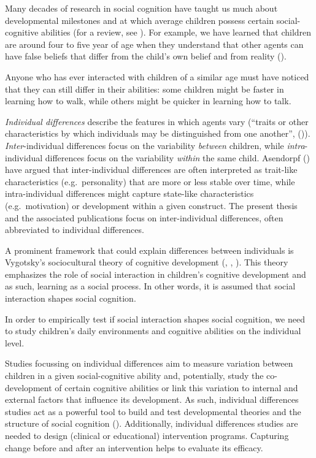 \documentclass[
]{scrbook}
\begin{document}
Many decades of research in social cognition have taught us much about developmental milestones and at which average children possess certain social-cognitive abilities (for a review, see ). For example, we have learned that children are around four to five year of age when they understand that other agents can have false beliefs that differ from the child's own belief and from reality ().

Anyone who has ever interacted with children of a similar age must have noticed that they can still differ in their abilities: some children might be faster in learning how to walk, while others might be quicker in learning how to talk.

\emph{Individual differences} describe the features in which agents vary (``traits or other characteristics by which individuals may be distinguished from one another'', ()). \emph{Inter}-individual differences focus on the variability \emph{between} children, while \emph{intra}-individual differences focus on the variability \emph{within} the same child. Asendorpf () have argued that inter-individual differences are often interpreted as trait-like characteristics (e.g.~personality) that are more or less stable over time, while intra-individual differences might capture state-like characteristics (e.g.~motivation) or development within a given construct. The present thesis and the associated publications focus on inter-individual differences, often abbreviated to individual differences.

A prominent framework that could explain differences between individuals is Vygotsky's sociocultural theory of cognitive development (, , ). This theory emphasizes the role of social interaction in children's cognitive development and as such, learning as a social process. In other words, it is assumed that social interaction shapes social cognition.

In order to empirically test if social interaction shapes social cognition, we need to study children's daily environments and cognitive abilities on the individual level.

Studies focussing on individual differences aim to measure variation between children in a given social-cognitive ability and, potentially, study the co-development of certain cognitive abilities or link this variation to internal and external factors that influence its development. As such, individual differences studies act as a powerful tool to build and test developmental theories and the structure of social cognition (). Additionally, individual differences studies are needed to design (clinical or educational) intervention programs. Capturing change before and after an intervention helps to evaluate its efficacy.
\end{document}
